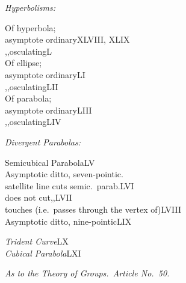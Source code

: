 \documentclass[11pt,a4paper]{article}
\begin{document}
\noindent\textit{Hyperbolisms:}
\smallskip

\noindent\quad Of hyperbola;\\
\quad\quad asymptote ordinary\quad XLVIII, XLIX\\
\quad\quad,,\quad osculating\quad L\\
\quad Of ellipse;\\
\quad\quad asymptote ordinary\quad LI\\
\quad\quad,,\quad osculating\quad LII\\
\quad Of parabola;\\
\quad\quad asymptote ordinary\quad LIII\\
\quad\quad,,\quad osculating\quad LIV

\smallskip

\noindent\textit{Divergent Parabolas:}
\smallskip

\noindent\quad Semicubical Parabola\quad LV\\
\quad Asymptotic ditto, seven-pointic.\\
\quad\quad satellite line cuts semic.\ parab.\quad LVI\\
\quad\quad does not cut\quad\quad,,\quad\quad LVII\\
\quad\quad touches (i.e.\ passes through the vertex of)\quad LVIII\\
\quad Asymptotic ditto, nine-pointic\quad LIX

\smallskip

\noindent\textit{Trident Curve}\quad LX\\
\noindent\textit{Cubical Parabola}\quad LXI

\medskip

\noindent\textit{As to the Theory of Groups.\ Article No.\ 50.}

\medskip
\end{document}
